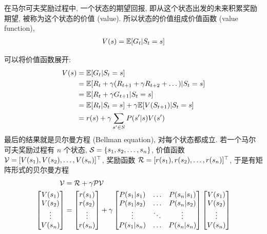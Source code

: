 \begin{definition}[价值函数]
    在马尔可夫奖励过程中, 一个状态的期望回报, 即从这个状态出发的未来积累奖励期望, 被称为这个状态的价值 (value). 所以状态的价值组成价值函数 (value function), 
    \begin{align*}
        V(s) = \mathbb{E} [G_t | S_t = s]
    \end{align*}
\end{definition}

可以将价值函数展开:
\begin{align*}
    V(s) &= \mathbb{E} [G_t | S_t = s]\\
    &= \mathbb{E} [R_t + \gamma(R_{t+1} + \gamma R_{t+2} + \dots) | S_t = s] \\
    &= \mathbb{E} [R_t + \gamma G_{t+1} | S_t = s] \\
    &= \mathbb{E} [R_t | S_t = s]  + \gamma \mathbb{E} [ V(S_{t+1}) | S_t = s]\\ 
    &= r(s) + \gamma \sum_{s'\in S} P(s' |s) V(s')
\end{align*}
最后的结果就是贝尔曼方程 (Bellman equation), 对每个状态都成立. 若一个马尔可夫奖励过程有 $n$ 个状态, $\mathcal{S} = \{ s_1, s_2, \dots, s_n \}$, 价值函数 $\mathcal{V} = [V(s_1), V(s_2) ,\dots, V(s_n)]^\top$, 奖励函数 $\mathcal{R} = [r(s_1) , r(s_2) , \dots , r(s_n)]^\top $, 于是有矩阵形式的贝尔曼方程
\begin{align*}
    \mathcal{V} &= \mathcal{R} + \gamma \mathcal{P} \mathcal{V}\\
    \begin{bmatrix}
        V(s_1)\\ V(s_2) \\ \vdots\\ V(s_n)
    \end{bmatrix} &= \begin{bmatrix}
        r(s_1) \\ r(s_2) \\ \vdots \\ r(s_n)
    \end{bmatrix} + \gamma \begin{bmatrix}
        P(s_1|s_1) & \dots & P(s_n|s_1)\\
        P(s_1|s_2) & \dots & P(s_n|s_2)\\
        \vdots & \ddots & \vdots \\
        P(s_1|s_n) & \dots & P(s_n|s_n)\\
    \end{bmatrix}\begin{bmatrix}
        V(s_1)\\ V(s_2) \\ \vdots\\ V(s_n)
    \end{bmatrix} 
\end{align*}

